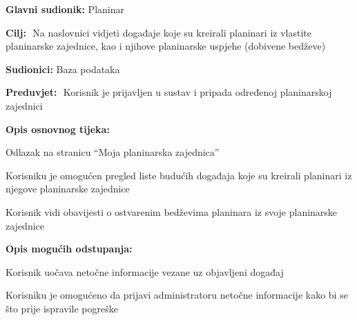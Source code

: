 		\noindent {}
		\begin{packed_item}
			
			\item \textbf{Glavni sudionik: }$ $Planinar$ $
			\item  \textbf{Cilj:} $ $ Na naslovnici vidjeti događaje koje su kreirali planinari iz vlastite planinarske zajednice, kao i njihove planinarske uspjehe (dobivene bedževe)$ $
			\item  \textbf{Sudionici:} $ $Baza podataka $ $
			\item  \textbf{Preduvjet:} $ $ Korisnik je prijavljen u sustav i pripada određenoj planinarskoj zajednici $ $
			\item  \textbf{Opis osnovnog tijeka:}
			
			\item[] \begin{packed_enum}
				
				\item $ $Odlazak na stranicu “Moja planinarska zajednica”$ $
				\item $ $Korisniku je omogućen pregled liste budućih događaja koje su kreirali planinari iz njegove planinarske zajednice$ $
				\item $ $Korisnik vidi obavijesti o ostvarenim bedževima planinara iz svoje planinarske zajednice$ $
				
			\end{packed_enum}
			
			\item  \textbf{Opis mogućih odstupanja:}
			
			\item[] \begin{packed_item}
				
				\item[2.a] $ $Korisnik uočava netočne informacije vezane uz objavljeni događaj$ $
				\item[] \begin{packed_enum}
					
					\item $ $Korisniku je omogućeno da prijavi administratoru netočne informacije kako bi se što prije ispravile pogreške $ $
					
				\end{packed_enum}
			\end{packed_item}
		\end{packed_item}
	
